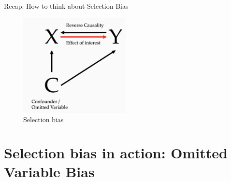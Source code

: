 \documentclass[11pt]{beamer}
\begin{document}
\begin{frame}{Recap: How to think about Selection Bias}
    \begin{figure}
        \centering
        \includegraphics[width=0.5\textwidth]{DAGs/selectionbias.png}
        \caption{Selection bias}
        \label{fig:selectionbias}
    \end{figure}
\end{frame}




\section{Selection bias in action: Omitted Variable Bias}
\end{document}
